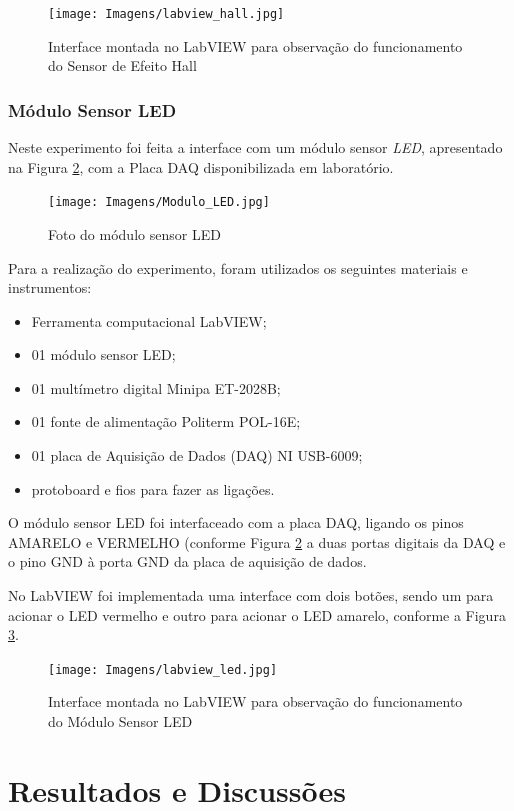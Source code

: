 \documentclass[a4paper]{instrumentacao}
\begin{document}
\begin{figure}[H]
\centering
\texttt{[image: Imagens/labview\_hall.jpg]}
\caption{Interface montada no LabVIEW para observação do funcionamento do Sensor de Efeito Hall}
\label{fig:labview-hall}
\end{figure}

\subsection{Módulo Sensor LED}
Neste experimento foi feita a interface com um módulo sensor \textit{LED}, apresentado na Figura \ref{fig:modulo-led}, com a Placa DAQ disponibilizada em laboratório.

\begin{figure}[H]
\centering
\texttt{[image: Imagens/Modulo\_LED.jpg]}
\caption{Foto do módulo sensor LED}
\label{fig:modulo-led}
\end{figure}

Para a realização do experimento, foram utilizados os seguintes materiais e instrumentos:

\begin{itemize}
	\item Ferramenta computacional LabVIEW;
	\item 01 módulo sensor LED;
	\item 01 multímetro digital Minipa ET-2028B;
	\item 01 fonte de alimentação Politerm POL-16E;
	\item 01 placa de Aquisição de Dados (DAQ) NI  USB-6009;
	\item protoboard e fios para fazer as ligações. 
\end{itemize}

O módulo sensor LED foi interfaceado com a placa DAQ, ligando os pinos AMARELO e VERMELHO (conforme Figura \ref{fig:modulo-led} a duas portas digitais da DAQ e o pino GND à porta GND da placa de aquisição de dados.

No LabVIEW foi implementada uma interface com dois botões, sendo um para acionar o LED vermelho e outro para acionar o LED amarelo, conforme a Figura \ref{fig:labview-led}.

\begin{figure}[H]
\centering
\texttt{[image: Imagens/labview\_led.jpg]}
\caption{Interface montada no LabVIEW para observação do funcionamento do Módulo Sensor LED}
\label{fig:labview-led}
\end{figure}

\chapter{Resultados e Discussões}
\end{document}
